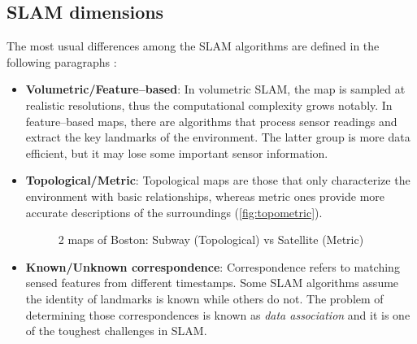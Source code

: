 \subsection{SLAM dimensions}

The most usual differences among the SLAM algorithms are defined in the following paragraphs :

\begin{itemize}
  \item \textbf{Volumetric/Feature--based}: In volumetric SLAM, the map is sampled at realistic resolutions, thus the computational complexity grows notably. In feature--based maps, there are algorithms that process sensor readings and extract the key landmarks of the environment. The latter group is more data efficient, but it may lose some important sensor information.

  \item \textbf{Topological/Metric}: Topological maps are those that only characterize the environment with basic relationships, whereas metric ones provide more accurate descriptions of the surroundings (\autoref{fig:topometric}).
  \begin{figure}[htb]
    \centering
     \quad
    \caption[2 maps of Boston]{2 maps of Boston: Subway (Topological) vs Satellite (Metric)}
    \label{fig:topometric}
  \end{figure}
  

  \item \textbf{Known/Unknown correspondence}: Correspondence refers to matching sensed features from different timestamps. Some SLAM algorithms assume the identity of landmarks is known while others do not. The problem of determining those correspondences is known as \emph{data association} and it is one of the toughest challenges in SLAM.


\end{itemize}
